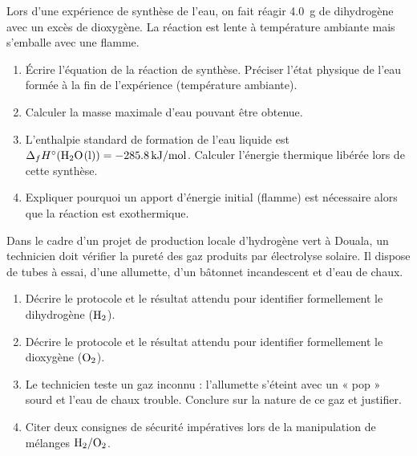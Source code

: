 \documentclass[11pt]{article}
\begin{document}
\begin{exercice}
Lors d'une expérience de synthèse de l'eau, on fait réagir \SI{4,0}{g} de dihydrogène avec un excès de dioxygène. La réaction est lente à température ambiante mais s'emballe avec une flamme.
\begin{enumerate}
    \item Écrire l'équation de la réaction de synthèse. Préciser l'état physique de l'eau formée à la fin de l'expérience (température ambiante).
    \item Calculer la masse maximale d'eau pouvant être obtenue.
    \item L'enthalpie standard de formation de l'eau liquide est $\Delta_f H^\circ(\ce{H2O(l)}) = \SI{-285,8}{kJ/mol}$. Calculer l'énergie thermique libérée lors de cette synthèse.
    \item Expliquer pourquoi un apport d'énergie initial (flamme) est nécessaire alors que la réaction est exothermique.
\end{enumerate}
\end{exercice}

\begin{exercice}
Dans le cadre d'un projet de production locale d'hydrogène vert à Douala, un technicien doit vérifier la pureté des gaz produits par électrolyse solaire. Il dispose de tubes à essai, d'une allumette, d'un bâtonnet incandescent et d'eau de chaux.
\begin{enumerate}
    \item Décrire le protocole et le résultat attendu pour identifier formellement le dihydrogène ($\ce{H2}$).
    \item Décrire le protocole et le résultat attendu pour identifier formellement le dioxygène ($\ce{O2}$).
    \item Le technicien teste un gaz inconnu : l'allumette s'éteint avec un « pop » sourd et l'eau de chaux trouble. Conclure sur la nature de ce gaz et justifier.
    \item Citer deux consignes de sécurité impératives lors de la manipulation de mélanges $\ce{H2}/\ce{O2}$.
\end{enumerate}
\end{exercice}
\end{document}
